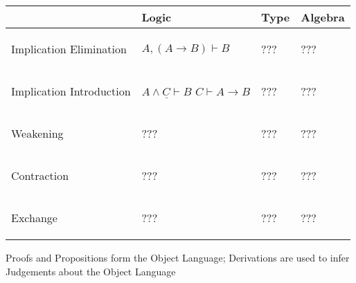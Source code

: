 \begin{tabular}{| p{2cm} | p{3cm} | p{4.5cm} | p{3cm} |}
\hline
& \textbf{Logic} & \textbf{Type} & \textbf{Algebra}\\ \hline \hline
Implication Elimination
  & \begin{center} $A, (A \rightarrow B) \vdash B$ \end{center}
  & \begin{center} ??? \end{center}
  & \begin{center} ??? \end{center} \\ \hline
Implication Introduction
  & \begin{center}
      $\underline{A \wedge C \vdash B}$\newline
      $C \vdash A \rightarrow B$
    \end{center}
  & \begin{center} ??? \end{center}
  & \begin{center} ??? \end{center} \\ \hline
Weakening
  & \begin{center} ??? \end{center}
  & \begin{center} ??? \end{center}
  & \begin{center} ??? \end{center} \\ \hline
Contraction
  & \begin{center} ??? \end{center}
  & \begin{center} ??? \end{center}
  & \begin{center} ??? \end{center} \\ \hline
Exchange
  & \begin{center} ??? \end{center}
  & \begin{center} ??? \end{center}
  & \begin{center} ??? \end{center} \\ \hline
\hline
\end{tabular}

Proofs and Propositions form the Object Language; Derivations are used
to infer Judgements about the Object Language

